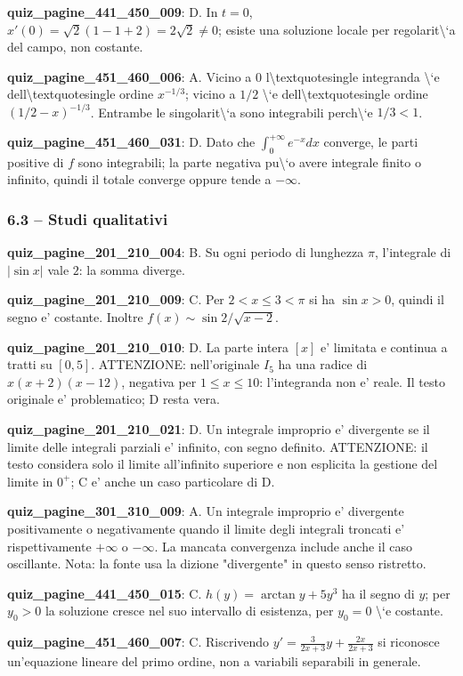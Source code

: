 \documentclass[11pt,a4paper]{article}
\newcounter{quiz}
\begin{document}
\noindent\textbf{quiz\_pagine\_441\_450\_009}: D. In $t=0$, $x\prime(0)=\sqrt2(1-1+2)=2\sqrt2\ne0$; esiste una soluzione locale per regolarit\textbackslash{}`a del campo, non costante.\par\medskip
\noindent\textbf{quiz\_pagine\_451\_460\_006}: A. Vicino a $0$ l\textbackslash{}textquotesingle integranda \textbackslash{}`e dell\textbackslash{}textquotesingle ordine $x^{-1/3}$; vicino a $1/2$ \textbackslash{}`e dell\textbackslash{}textquotesingle ordine $(1/2-x)^{-1/3}$. Entrambe le singolarit\textbackslash{}`a sono integrabili perch\textbackslash{}`e $1/3<1$.\par\medskip
\noindent\textbf{quiz\_pagine\_451\_460\_031}: D. Dato che $\int_0^{+\infty}e^{-x}dx$ converge, le parti positive di $f$ sono integrabili; la parte negativa pu\textbackslash{}`o avere integrale finito o infinito, quindi il totale converge oppure tende a $-\infty$.\par\medskip
\subsubsection*{6.3 -- Studi qualitativi}
\noindent\textbf{quiz\_pagine\_201\_210\_004}: B. Su ogni periodo di lunghezza $\pi$, l'integrale di $|\sin x|$ vale $2$: la somma diverge.\par\medskip
\noindent\textbf{quiz\_pagine\_201\_210\_009}: C. Per $2<x\le3<\pi$ si ha $\sin x>0$, quindi il segno e' costante. Inoltre $f(x)\sim\sin2/\sqrt{x-2}$.\par\medskip
\noindent\textbf{quiz\_pagine\_201\_210\_010}: D. La parte intera $[x]$ e' limitata e continua a tratti su $[0,5]$. ATTENZIONE: nell'originale $I_5$ ha una radice di $x(x+2)(x-12)$, negativa per $1\le x\le10$: l'integranda non e' reale. Il testo originale e' problematico; D resta vera.\par\medskip
\noindent\textbf{quiz\_pagine\_201\_210\_021}: D. Un integrale improprio e' divergente se il limite delle integrali parziali e' infinito, con segno definito. ATTENZIONE: il testo considera solo il limite all'infinito superiore e non esplicita la gestione del limite in $0^+$; C e' anche un caso particolare di D.\par\medskip
\noindent\textbf{quiz\_pagine\_301\_310\_009}: A. Un integrale improprio e' divergente positivamente o negativamente quando il limite degli integrali troncati e' rispettivamente $+\infty$ o $-\infty$. La mancata convergenza include anche il caso oscillante. Nota: la fonte usa la dizione "divergente" in questo senso ristretto.\par\medskip
\noindent\textbf{quiz\_pagine\_441\_450\_015}: C. $h(y)=\arctan y+5y^3$ ha il segno di $y$; per $y_0>0$ la soluzione cresce nel suo intervallo di esistenza, per $y_0=0$ \textbackslash{}`e costante.\par\medskip
\noindent\textbf{quiz\_pagine\_451\_460\_007}: C. Riscrivendo $y'=\frac{3}{2x+3}y+\frac{2x}{2x+3}$ si riconosce un'equazione lineare del primo ordine, non a variabili separabili in generale.\par\medskip
\end{document}
